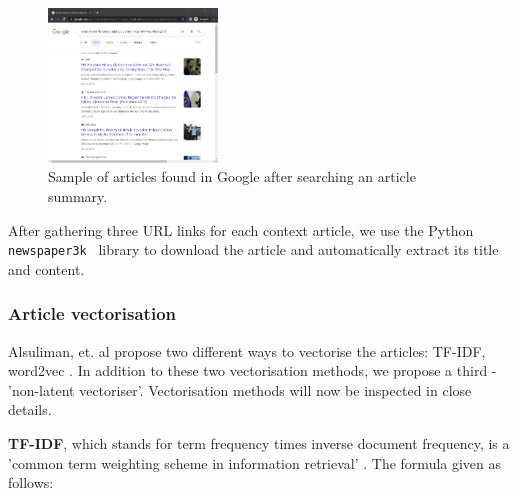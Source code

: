 \documentclass{article}
\begin{document}
\begin{figure}[H]
  \centering
  \includegraphics[width=0.4\textwidth]{img/chrome-article-scraping.png}
  \caption{Sample of articles found in Google after searching an article summary.}
\end{figure}

\noindent
After gathering three URL links for each context article, we use the Python \verb|newspaper3k|~\cite{py-newspaper} library to download the article and automatically extract its title and content.


\subsubsection{Article vectorisation} \label{section:article-vectorisation}
Alsuliman, et. al propose two different ways to vectorise the articles: TF-IDF, word2vec \cite{alsuliman2022social}. In addition to these two vectorisation methods, we propose a third - 'non-latent vectoriser'. Vectorisation methods will now be inspected in close details.

\textbf{TF-IDF}, which stands for term frequency times inverse document frequency, is a 'common term weighting scheme in information retrieval' \cite{scikit-learn}. The formula given as follows:
\end{document}
